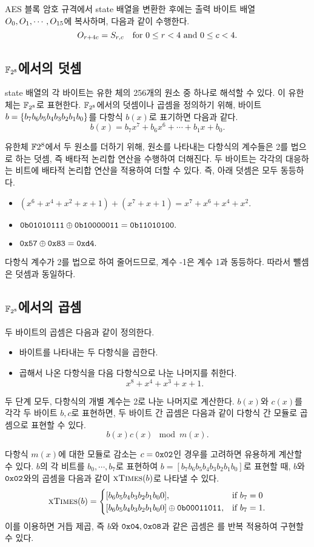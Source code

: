 \documentclass{article}
\begin{document}
AES 블록 암호 규격에서 state 배열을 변환한 후에는 출력 바이트 배열 $O_0,
O_1, \cdots, O_{15}$에 복사하며, 다음과 같이 수행한다.
$$
    O_{r + 4c} = S_{r, c} \quad \text{for } 0 \le r < 4 \text{ and } 0 \le c < 4.
$$

\subsection{$\mathbb{F}_{2^8}$에서의 덧셈}

state 배열의 각 바이트는 유한 체의 256개의 원소 중 하나로 해석할 수 있다. 이
유한체는 $\mathbb{F}_{2^8}$로 표현한다. $\mathbb{F}_{2^8}$에서의 덧셈이나 곱셈을 정의하기 위해,
바이트 $b = \{b_7 b_6 b_5 b_4 b_3 b_2 b_1 b_0\}$를 다항식 $b(x)$로 표기하면
다음과 같다.
$$
    b(x) = b_7x^7 + b_6x^6 + \cdots + b_1x + b_0.
$$

유한체 $\mathbb{F}{2^8}$에서 두 원소를 더하기 위해, 원소를 나타내는 다항식의 계수들은 2를
법으로 하는 덧셈, 즉 배타적 논리합 연산을 수행하여 더해진다. 두 바이트는 각각의
대응하는 비트에 배타적 논리합 연산을 적용하여 더할 수 있다. 즉, 아래 덧셈은 모두 동등하다.
\begin{itemize}
    \item $(x^6 + x^4 + x^2 + x + 1) + (x^7 + x + 1) = x^7 + x^6 + x^4 + x^2.$
    \item $\texttt{0b01010111} \oplus \texttt{0b10000011} = \texttt{0b11010100}.$
    \item $\texttt{0x57} \oplus \texttt{0x83} = \texttt{0xd4}.$
\end{itemize}

다항식 계수가 2를 법으로 하여 줄어드므로, 계수 -1은 계수 1과 동등하다. 따라서
뺄셈은 덧셈과 동일하다.

\subsection{$\mathbb{F}_{2^8}$에서의 곱셈}

두 바이트의 곱셈은 다음과 같이 정의한다.
\begin{itemize}
    \item 바이트를 나타내는 두 다항식을 곱한다.
    \item 곱해서 나온 다항식을 다음 다항식으로 나눈 나머지를 취한다.
    $$
        x^8 + x^4 + x^3 + x + 1.
    $$
\end{itemize}
두 단계 모두, 다항식의 개별 계수는 2로 나눈 나머지로 계산한다. $b(x)$와 $c(x)$를
각각 두 바이트 $b, c$로 표현하면, 두 바이트 간 곱셈은 다음과 같이 다항식 간
모듈로 곱셈으로 표현할 수 있다.
$$
    b(x)c(x) \mod m(x).
$$

다항식 $m(x)$에 대한 모듈로 감소는 $c = \texttt{0x02}$인 경우를 고려하면 유용하게
계산할 수 있다. $b$의 각 비트를 $b_0, \cdots, b_7$로 표현하여 $b = [b_7b_6
b_5b_4b_3b_2b_1b_0]$로 표현할 때, $b$와 $\texttt{0x02}$와의 곱셈을 다음과 같이
$\textsc{xTimes}(b)$로 나타낼 수 있다.
$$
    \textsc{xTimes}(b) = \begin{cases}
        [b_6 b_5 b_4 b_3 b_2 b_1 b_0 0], & \text{if } b_7 = 0 \\
        [b_6 b_5 b_4 b_3 b_2 b_1 b_0 0] \oplus \texttt{0b00011011}, & \text{if } b_7 = 1.
    \end{cases}
$$
이를 이용하면 거듭 제곱, 즉 $b$와 $\texttt{0x04}, \texttt{0x08}$과 같은 곱셈은 \XT 를 반복
적용하여 구현할 수 있다.
\end{document}
